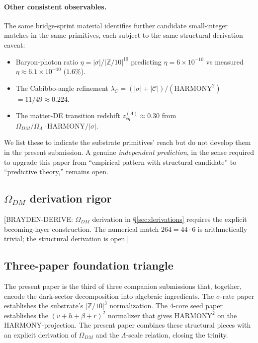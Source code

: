 \documentclass[11pt,reqno]{amsart}
\theoremstyle{plain}
\theoremstyle{definition}
\theoremstyle{remark}
\newcommand{\Z}{\mathbb{Z}}
\begin{document}
\paragraph{Other consistent observables.}
The same bridge-sprint material identifies further candidate
small-integer matches in the same primitives, each subject to
the same structural-derivation caveat:
\begin{itemize}
\item Baryon-photon ratio $\eta = |\sigma|/|\Z/10|^{10}$
predicting $\eta = 6 \times 10^{-10}$ vs measured
$\eta \approx 6.1 \times 10^{-10}$ ($1.6\%$).
\item The Cabibbo-angle refinement
$\lambda_C = (|\sigma| + |\mathcal{C}|)/(\mathrm{HARMONY}^2)$
$= 11/49 \approx 0.224$.
\item The matter-DE transition redshift $z_{eq}^{(\Lambda)}
\approx 0.30$ from $\Omega_{DM}/\Omega_\Lambda \cdot
\mathrm{HARMONY}/|\sigma|$.
\end{itemize}
We list these to indicate the substrate primitives' reach but do
not develop them in the present submission. A genuine
\emph{independent prediction}, in the sense required to upgrade
this paper from ``empirical pattern with structural candidate''
to ``predictive theory,'' remains open.

\subsection{$\Omega_{DM}$ derivation rigor}

[BRAYDEN-DERIVE: $\Omega_{DM}$ derivation in
\S\ref{sec:derivations} requires the explicit becoming-layer
construction. The numerical match $264 = 44 \cdot 6$ is
arithmetically trivial; the structural derivation is open.]

\subsection{Three-paper foundation triangle}

The present paper is the third of three companion submissions
that, together, encode the dark-sector decomposition into
algebraic ingredients. The $\sigma$-rate paper
\cite{SandersGish2026JCAP} establishes the substrate's
$|\Z/10|^{3}$ normalization. The $4$-core seed paper
\cite{SandersGish2026FourCore} establishes the
$(v + h + \beta + r)^{2}$ normalizer that gives
$\mathrm{HARMONY}^{2}$ on the $\mathrm{HARMONY}$-projection. The
present paper combines these structural pieces with an explicit
derivation of $\Omega_{DM}$ and the $\Lambda$-scale relation,
closing the trinity.
\end{document}
